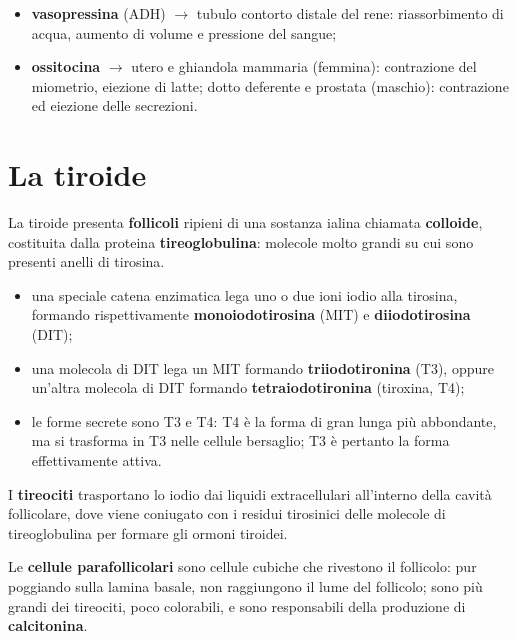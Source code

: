\begin{itemize}
  \item \textbf{vasopressina} (ADH) $\rightarrow$ tubulo contorto distale
    del rene: riassorbimento di acqua, aumento di volume e pressione del
    sangue;
  \item \textbf{ossitocina} $\rightarrow$ utero e ghiandola mammaria
    (femmina): contrazione del miometrio, eiezione di latte; dotto
    deferente e prostata (maschio): contrazione ed eiezione delle
    secrezioni.
\end{itemize}

\section{La tiroide}

La tiroide presenta \textbf{follicoli} ripieni di una sostanza ialina
chiamata \textbf{colloide}, costituita dalla proteina
\textbf{tireoglobulina}: molecole molto grandi su cui sono presenti anelli
di tirosina.

\begin{itemize}
  \item una speciale catena enzimatica lega uno o due ioni iodio alla
    tirosina, formando rispettivamente \textbf{monoiodotirosina} (MIT) e
    \textbf{diiodotirosina} (DIT);
  \item una molecola di DIT lega un MIT formando \textbf{triiodotironina}
    (T3), oppure un'altra molecola di DIT formando \textbf{tetraiodotironina}
    (tiroxina, T4);
  \item le forme secrete sono T3 e T4: T4 è la forma di gran lunga più
    abbondante, ma si trasforma in T3 nelle cellule bersaglio; T3 è
    pertanto la forma effettivamente attiva.
\end{itemize}

I \textbf{tireociti} trasportano lo iodio dai liquidi extracellulari
all'interno della cavità follicolare, dove viene coniugato con i residui
tirosinici delle molecole di tireoglobulina per formare gli ormoni
tiroidei.

Le \textbf{cellule parafollicolari} sono cellule cubiche che rivestono il
follicolo: pur poggiando sulla lamina basale, non raggiungono il lume del
follicolo; sono più grandi dei tireociti, poco colorabili, e sono
responsabili della produzione di \textbf{calcitonina}.

